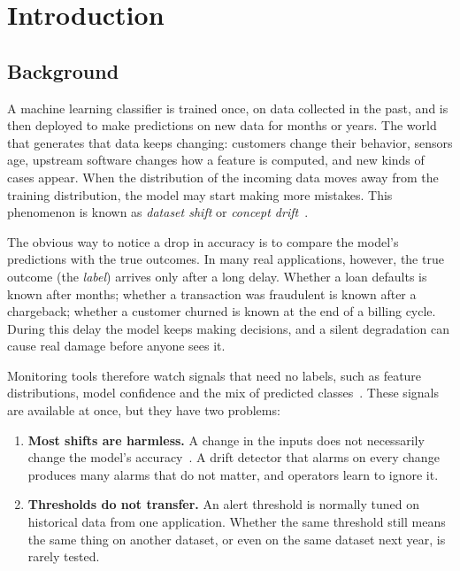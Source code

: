 
\chapter{Introduction}
\label{ch:intro}

\section{Background}
A machine learning classifier is trained once, on data collected in the past, and is then deployed to make predictions on new data for months or years. The world that generates that data keeps changing: customers change their behavior, sensors age, upstream software changes how a feature is computed, and new kinds of cases appear. When the distribution of the incoming data moves away from the training distribution, the model may start making more mistakes. This phenomenon is known as \emph{dataset shift} or \emph{concept drift}~\cite{gama2014survey,quinonero2009shift}.

The obvious way to notice a drop in accuracy is to compare the model's predictions with the true outcomes. In many real applications, however, the true outcome (the \emph{label}) arrives only after a long delay. Whether a loan defaults is known after months; whether a transaction was fraudulent is known after a chargeback; whether a customer churned is known at the end of a billing cycle. During this delay the model keeps making decisions, and a silent degradation can cause real damage before anyone sees it.

Monitoring tools therefore watch signals that need no labels, such as feature distributions, model confidence and the mix of predicted classes~\cite{sculley2015debt,breck2017mltest}. These signals are available at once, but they have two problems:
\begin{enumerate}
\item \textbf{Most shifts are harmless.} A change in the inputs does not necessarily change the model's accuracy~\cite{rabanser2019failing}. A drift detector that alarms on every change produces many alarms that do not matter, and operators learn to ignore it.
\item \textbf{Thresholds do not transfer.} An alert threshold is normally tuned on historical data from one application. Whether the same threshold still means the same thing on another dataset, or even on the same dataset next year, is rarely tested.
\end{enumerate}

